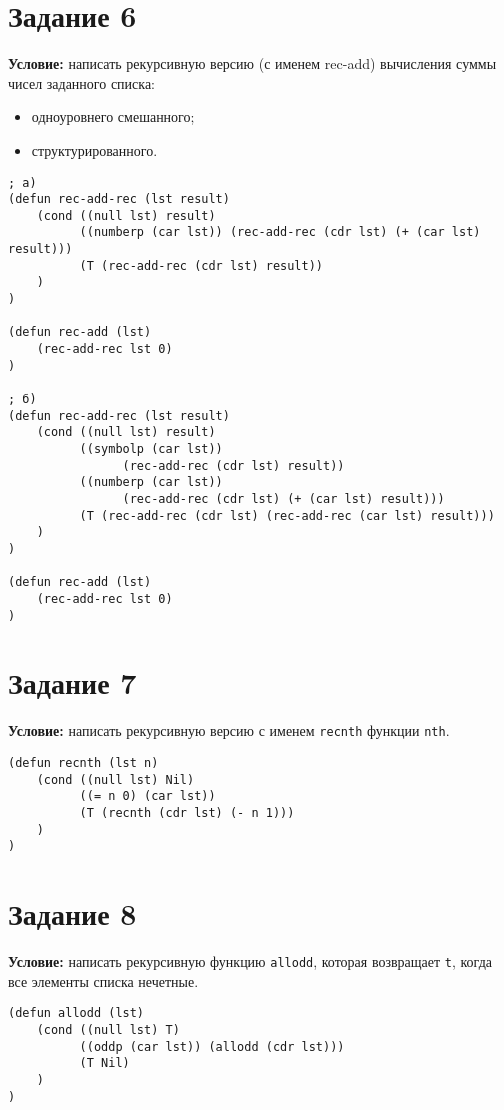 \section{Задание 6}

\textbf{Условие:} написать рекурсивную версию (с именем rec-add) вычисления суммы чисел заданного списка:
\begin{itemize}
    \item одноуровнего смешанного;
    \item структурированного.
\end{itemize}

\begin{lstlisting}
; a)
(defun rec-add-rec (lst result)
    (cond ((null lst) result)
          ((numberp (car lst)) (rec-add-rec (cdr lst) (+ (car lst) result)))
          (T (rec-add-rec (cdr lst) result))
    )
)

(defun rec-add (lst)
    (rec-add-rec lst 0)
)

; б)
(defun rec-add-rec (lst result)
    (cond ((null lst) result)
          ((symbolp (car lst)) 
                (rec-add-rec (cdr lst) result))
          ((numberp (car lst)) 
                (rec-add-rec (cdr lst) (+ (car lst) result)))
          (T (rec-add-rec (cdr lst) (rec-add-rec (car lst) result)))
    )
)

(defun rec-add (lst)
    (rec-add-rec lst 0)
)    
\end{lstlisting}


\section{Задание 7}

\textbf{Условие:} написать рекурсивную версию с именем \texttt{recnth} функции \texttt{nth}.

\begin{lstlisting}
(defun recnth (lst n)
    (cond ((null lst) Nil)
          ((= n 0) (car lst))
          (T (recnth (cdr lst) (- n 1)))
    )
)
\end{lstlisting}


\section{Задание 8}

\textbf{Условие:} написать рекурсивную функцию \texttt{allodd}, которая возвращает \texttt{t}, когда все элементы списка нечетные.

\begin{lstlisting}
(defun allodd (lst)
    (cond ((null lst) T)
          ((oddp (car lst)) (allodd (cdr lst)))
          (T Nil)
    )
)   
\end{lstlisting}


